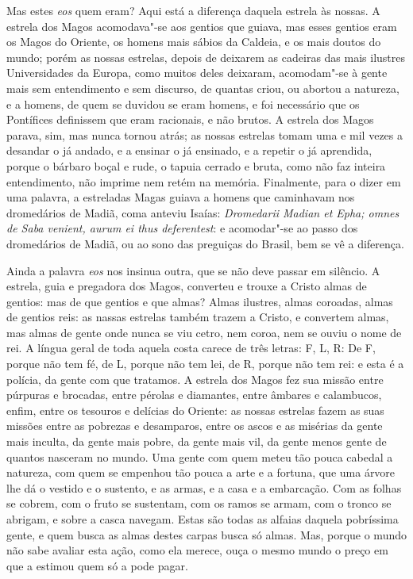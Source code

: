 Mas estes \emph{eos} quem eram? Aqui está a diferença daquela
estrela às nossas. A estrela dos Magos acomodava"-se aos gentios que
guiava, mas esses gentios eram os Magos do Oriente, os homens mais
sábios da Caldeia, e os mais doutos do mundo; porém as nossas estrelas,
depois de deixarem as cadeiras das mais ilustres Universidades da Europa,
como muitos deles deixaram, acomodam"-se à gente mais sem
entendimento e sem discurso, de quantas criou, ou abortou a natureza, e
a homens, de quem se duvidou se eram homens, e foi necessário que os
Pontífices definissem que eram racionais, e não brutos. A estrela dos
Magos parava, sim, mas nunca tornou atrás; as nossas estrelas tomam uma
e mil vezes a desandar o já andado, e a ensinar o já ensinado, e a
repetir o já aprendida, porque o bárbaro boçal e rude, o tapuia cerrado
e bruta, como não faz inteira entendimento, não imprime nem retém na
memória. Finalmente, para o dizer em uma palavra, a estreladas Magas
guiava a homens que caminhavam nos dromedários de Madiã, coma anteviu
Isaías: \emph{Dromedarii Madian et Epha; omnes de Saba venient, aurum ei
thus deferentest}: e acomodar"-se ao passo dos dromedários
de Madiã, ou ao sono das preguiças do Brasil, bem se vê a diferença.

Ainda a palavra \emph{eos} nos insinua outra, que se não deve passar em
silêncio. A estrela, guia e pregadora dos Magos, converteu e trouxe a
Cristo almas de gentios: mas de que gentios e que almas? Almas ilustres,
almas coroadas, almas de gentios reis: as nassas estrelas também trazem
a Cristo, e convertem almas, mas almas de gente onde nunca se viu cetro,
nem coroa, nem se ouviu o nome de rei. A língua geral de toda aquela
costa carece de três letras: F, L, R: De F, porque não tem fé, de L,
porque não tem lei, de R, porque não tem rei: e esta é a polícia, da
gente com que tratamos. A estrela dos Magos fez sua missão entre
púrpuras e brocadas, entre pérolas e diamantes, entre âmbares e
calambucos, enfim, entre os tesouros e delícias do Oriente: as nossas
estrelas fazem as suas missões entre as pobrezas e desamparos, entre os
ascos e as misérias da gente mais inculta, da gente mais pobre, da gente
mais vil, da gente menos gente de quantos nasceram no mundo. Uma gente
com quem meteu tão pouca cabedal a natureza, com quem se empenhou tão
pouca a arte e a fortuna, que uma árvore lhe dá o vestido e o sustento,
e as armas, e a casa e a embarcação. Com as folhas se cobrem, com o
fruto se sustentam, com os ramos se armam, com o tronco se abrigam, e
sobre a casca navegam. Estas são todas as alfaias daquela pobríssima
gente, e quem busca as almas destes carpas busca só almas. Mas, porque o
mundo não sabe avaliar esta ação, como ela merece, ouça o mesmo mundo o
preço em que a estimou quem só a pode pagar.

